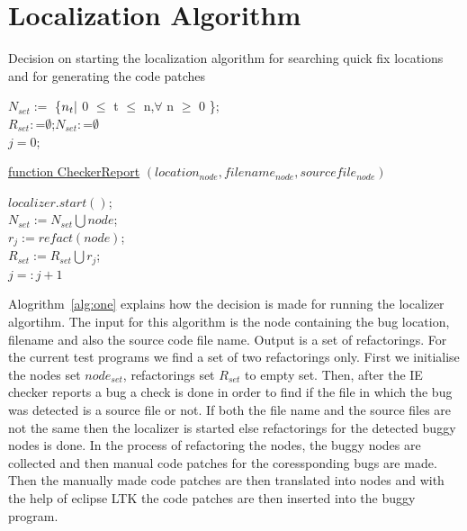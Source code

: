 \chapter{Localization Algorithm}
\label{chapter:Algorithm}
{\LinesNumberedHidden
\begin{algorithm}
\caption{Decision on starting the localization algorithm for searching quick fix locations and for generating the code patches}
\label{alg:one}
\SetAlgoLined
{}


$N_{set}:=$ \{$n_t\arrowvert$ 0 $\leq$ t $\leq$ n,$\forall$ n $\geq$ 0 \};       \textcolor{dkgreen}{\textbf{\selectfont{//set of nodes}}}\\
$R_{set}:$=$\emptyset$;$N_{set}:$=$\emptyset$\;        \textcolor{dkgreen}{\textbf{\selectfont{//initialising nodes set and refactoring set to empty}}}\\
$j=0$;

\underline{function CheckerReport} $(location_{node}, filename_{node}, sourcefile_{node})$

{
$localizer.start()$;          \textcolor{dkgreen}{\textbf{\selectfont{//Starting the localizer}}}\\
}
{
$N_{set}:=N_{set}\bigcup{node}$;     \textcolor{dkgreen}{\textbf{\selectfont{//adding node to node set}}}\\
$r_{j}:= refact(node)$;       \textcolor{dkgreen}{\textbf{\selectfont{//Refactoring the node}}}\\
$R_{set}:=R_{set}\bigcup{r_{j}}$;      \textcolor{dkgreen}{\textbf{\selectfont{//adding refactored node}}}\\
$j=:j+1$\;
}
\end{algorithm}
}

Alogrithm~\ref{alg:one} explains how the decision is made for running the localizer
algortihm. The input for this algorithm is the node containing the bug location,
filename and also the source code file name. Output is a set of refactorings.
For the current test programs we find a set of two refactorings only.
First we initialise the nodes set $node_{set}$, refactorings set $R_{set}$ to empty set.
Then, after the IE checker reports a bug a check is done in order to find if the
file in which the bug was detected is a source file or not. If both the file name and the source files
are not the same then the localizer is started else refactorings for the detected
buggy nodes is done. In the process of refactoring the nodes, the buggy nodes
are collected and then manual code patches for the coressponding bugs are made. Then 
the manually made code patches are then translated into nodes and with
the help of eclipse LTK the code patches are then inserted into the buggy program.


